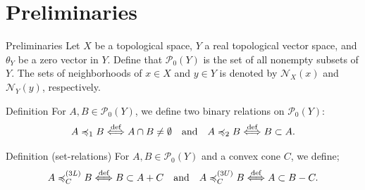 \documentclass[aspectratio=169, dvipdfmx, 11pt]{beamer}
\newcommand{\pow}[1]{\mathcal{P}_{0}(#1)}
\begin{document}
\section{Preliminaries}

\begin{frame}{Preliminaries}
  Let $X$ be a topological space, $Y$ a real topological vector space, and $\theta_Y$ be a zero vector in $Y$.
  Define that $\pow{Y}$ is the set of all nonempty subsets of $Y$.
  The sets of neighborhoods of $x \in X$ and $y \in Y$ is denoted by $\mathcal{N}_X (x)$ and $\mathcal{N}_Y (y)$, respectively.

  \begin{block}{Definition}
    For $A,B \in \pow{Y}$, we define two binary relations on $\pow{Y}$:
    \begin{equation}
      A \preccurlyeq_1 B \overset{\text{def}}{\Longleftrightarrow} A \cap B \ne \emptyset \quad \text{and} \quad A \preccurlyeq_2 B \overset{\text{def}}{\Longleftrightarrow} B \subset A. \notag
    \end{equation}
  \end{block}

  \begin{block}{Definition (set-relations) \cite{kuroiwa1997cone}}
    For $A,B \in \pow{Y}$ and a convex cone $C$, we define;
    \begin{equation}
      A \preccurlyeq_{C}^{(3L)} B \overset{\text{def}}{\Longleftrightarrow} B \subset A + C
      \quad \text{and} \quad A \preccurlyeq_{C}^{(3U)} B \overset{\text{def}}{\Longleftrightarrow} A \subset B -C. \notag
    \end{equation}
  \end{block}
\end{frame}
\end{document}
